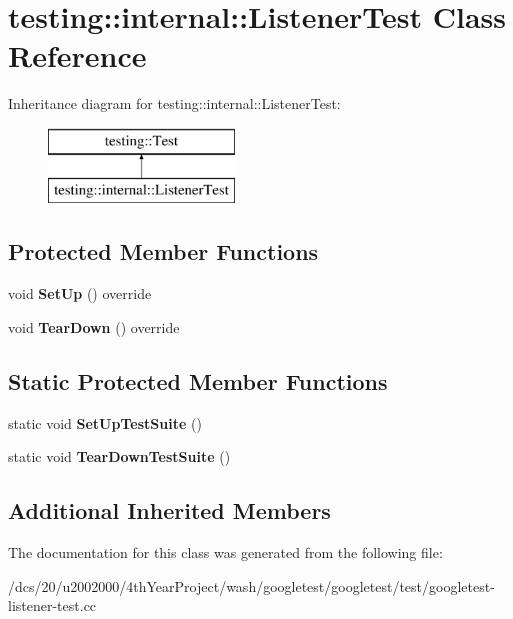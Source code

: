 \hypertarget{classtesting_1_1internal_1_1ListenerTest}{}\section{testing\+:\+:internal\+:\+:Listener\+Test Class Reference}
\label{classtesting_1_1internal_1_1ListenerTest}
Inheritance diagram for testing\+:\+:internal\+:\+:Listener\+Test\+:\begin{figure}[H]
\begin{center}
\leavevmode
\includegraphics[height=2.000000cm]{classtesting_1_1internal_1_1ListenerTest}
\end{center}
\end{figure}
\subsection*{Protected Member Functions}
\begin{DoxyCompactItemize}
\item 
\mbox{\label{classtesting_1_1internal_1_1ListenerTest_a84f28c5bd517cdc07ec7b3d612fa6e30}} 
void {\bfseries Set\+Up} () override
\item 
\mbox{\label{classtesting_1_1internal_1_1ListenerTest_a733f61300772e432a6a3ec7837c9f331}} 
void {\bfseries Tear\+Down} () override
\end{DoxyCompactItemize}
\subsection*{Static Protected Member Functions}
\begin{DoxyCompactItemize}
\item 
\mbox{\label{classtesting_1_1internal_1_1ListenerTest_a413d95ed635bc344add7f3ac3c459962}} 
static void {\bfseries Set\+Up\+Test\+Suite} ()
\item 
\mbox{\label{classtesting_1_1internal_1_1ListenerTest_a5b4dc58bd218f9893c79c2f2bbd85dd0}} 
static void {\bfseries Tear\+Down\+Test\+Suite} ()
\end{DoxyCompactItemize}
\subsection*{Additional Inherited Members}


The documentation for this class was generated from the following file\+:\begin{DoxyCompactItemize}
\item 
/dcs/20/u2002000/4th\+Year\+Project/wash/googletest/googletest/test/googletest-\/listener-\/test.\+cc\end{DoxyCompactItemize}
